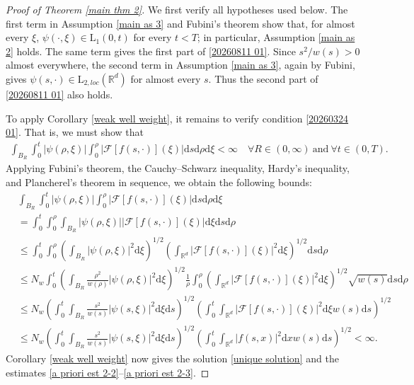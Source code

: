 \documentclass[11pt,reqno]{amsart}
\theoremstyle{definition}
\theoremstyle{remark}
\newcommand\bR{\mathbb{R}}
\newcommand\cF{\mathcal{F}}
\numberwithin{equation}{section}
\begin{document}
\vspace{2mm}
\begin{proof}[Proof of Theorem \ref{main thm 2}]

We first verify all hypotheses used below.  The first term in Assumption
\ref{main as 3} and Fubini's theorem show that, for almost every $\xi$,
$\psi(\cdot,\xi)\in\mathrm L_1(0,t)$ for every $t<T$; in particular,
Assumption \ref{main as 2} holds.  The same term gives the first part of
\eqref{20260811 01}.  Since $s^2/w(s)>0$ almost everywhere, the second term
in Assumption \ref{main as 3}, again by Fubini, gives
$\psi(s,\cdot)\in\mathrm L_{2,loc}(\bR^d)$ for almost every $s$.  Thus the
second part of \eqref{20260811 01} also holds.

To apply Corollary \ref{weak well weight}, it remains to verify condition
\eqref{20260324 01}. That is, we must show that
\begin{align*}
\int_{B_R} \int_0^t |\psi(\rho,\xi)| \int_0^\rho |\cF[f(s,\cdot)](\xi)| \mathrm{d}s \mathrm{d}\rho \mathrm{d}\xi < \infty \quad \forall R \in (0,\infty)~\text{and}~ \forall t \in (0,T).
\end{align*}
Applying Fubini's theorem, the Cauchy--Schwarz inequality, Hardy's inequality, and Plancherel's theorem in sequence, we obtain the following bounds:
\begin{align*}
&\int_{B_R} \int_0^t |\psi(\rho,\xi)| \int_0^\rho |\cF[f(s,\cdot)](\xi)| \mathrm{d}s \mathrm{d}\rho \mathrm{d}\xi \\
&= \int_0^t\int_0^\rho \int_{B_R} |\psi(\rho,\xi)|  |\cF[f(s,\cdot)](\xi)|\mathrm{d}\xi \mathrm{d}s \mathrm{d}\rho  \\
&\leq \int_0^t\int_0^\rho \left(\int_{B_R} |\psi(\rho,\xi)|^2 \mathrm{d}\xi\right)^{1/2} \left(\int_{\bR^d} |\cF[f(s,\cdot)](\xi)|^2 \mathrm{d}\xi \right)^{1/2} \mathrm{d}s \mathrm{d}\rho  \\
&\leq N_w \int_0^t\left(\int_{B_R} \frac{\rho^2}{w(\rho)} |\psi(\rho,\xi)|^2 \mathrm{d}\xi\right)^{1/2} \frac{1}{\rho} \int_0^\rho  \left(\int_{\bR^d} |\cF[f(s,\cdot)](\xi)|^2 \mathrm{d}\xi \right)^{1/2} \sqrt{w(s)} \mathrm{d}s \mathrm{d}\rho  \\
&\leq  N_w \left(\int_0^t \int_{B_R} \frac{s^2}{w(s)}|\psi(s,\xi)|^2 \mathrm{d}\xi \mathrm{d}s \right)^{1/2} \left(\int_0^t \int_{\bR^d} |\cF[f(s,\cdot)](\xi)|^2 \mathrm{d}\xi w(s) \mathrm{d}s \right)^{1/2}  \\
&\leq  N_w \left(\int_0^t \int_{B_R} \frac{s^2}{w(s)}|\psi(s,\xi)|^2 \mathrm{d}\xi \mathrm{d}s \right)^{1/2} \left(\int_0^t \int_{\bR^d} |f(s,x)|^2 \mathrm{d}x w(s) \mathrm{d}s \right)^{1/2} < \infty.
\end{align*}
Corollary \ref{weak well weight} now gives the solution \eqref{unique solution}
and the estimates \eqref{a priori est 2-2}--\eqref{a priori est 2-3}.


\end{proof}
\end{document}
